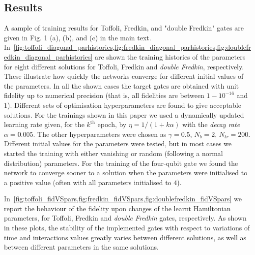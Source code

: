 \subsection{Results}
\label{subsec:numerical_results}

A sample of training results for Toffoli, Fredkin, and "double Fredkin" gates are given in Fig. 1 (a), (b), and (c) in the main text.
In~\cref{fig:toffoli_diagonal_parhistories,fig:fredkin_diagonal_parhistories,fig:doublefredkin_diagonal_parhistories} are shown the training histories of the parameters for eight different solutions for Toffoli, Fredkin and \emph{double Fredkin}, respectively.
These illustrate how quickly the networks converge for different initial values of the parameters.
In all the shown cases the target gates are obtained with unit fidelity up to numerical precision (that is, all fidelities are between $1-10^{-16}$ and $1$).
Different sets of optimisation hyperparameters are found to give acceptable solutions.
For the trainings shown in this paper we used a dynamically updated learning rate given, for the $k^{\text{th}}$ epoch, by $\eta=1/(1 + k \alpha)$ with the \emph{decay rate} $\alpha=0.005$.
The other hyperparameters were chosen as
$\gamma=0.5$, 
$N_b = 2$, $N_{tr} = 200$.
Different initial values for the parameters were tested, but in most cases we started the training with either vanishing or random (following a normal distribution) parameters.
For the training of the four-qubit gate we found the network to converge sooner to a solution when the parameters were initialised to a positive value (often with all parameters initialised to $4$).

In~\cref{fig:toffoli_fidVSpars,fig:fredkin_fidVSpars,fig:doublefredkin_fidVSpars} we report the behaviour of the fidelity upon changes of the learnt Hamiltonian parameters, for Toffoli, Fredkin and \emph{double Fredkin} gates, respectively.
As shown in these plots, the stability of the implemented gates with respect to variations of time and interactions values greatly varies between different solutions, as well as between different parameters in the same solutions.

